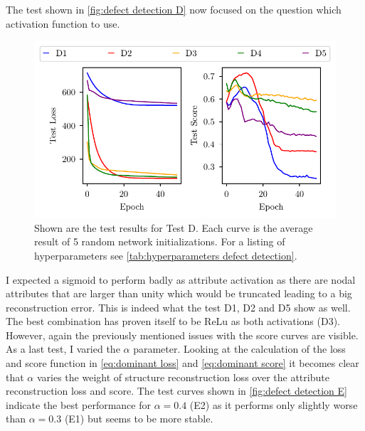 \documentclass[11pt,a4paper]{article}
\begin{document}
The test shown in \autoref{fig:defect detection D} now focused on the question which activation function to use. 
\begin{figure}[htbp]
\centering
\includegraphics{images/plots/defect_detection_D.pdf}
\caption{Shown are the test results for Test D. Each curve is the average result of 5 random network initializations. For a listing of hyperparameters see \autoref{tab:hyperparameters defect detection}.}
\label{fig:defect detection D}
\end{figure}
I expected a sigmoid to perform badly as attribute activation as there are nodal attributes that are larger than unity which would be truncated leading to a big reconstruction error. 
This is indeed what the test D1, D2 and D5 show as well. 
The best combination has proven itself to be ReLu as both activations (D3). 
However, again the previously mentioned issues with the score curves are visible. \\


As a last test, I varied the $\alpha$ parameter. 
Looking at the calculation of the loss and score function in \autoref{eq:dominant loss} and \autoref{eq:dominant score} it becomes clear that $\alpha$ varies the weight of structure reconstruction loss over the attribute reconstruction loss and score. 
The test curves shown in \autoref{fig:defect detection E} indicate the best performance for $\alpha=0.4$ (E2) as it performs only slightly worse than $\alpha=0.3$ (E1) but seems to be more stable. 
\end{document}
